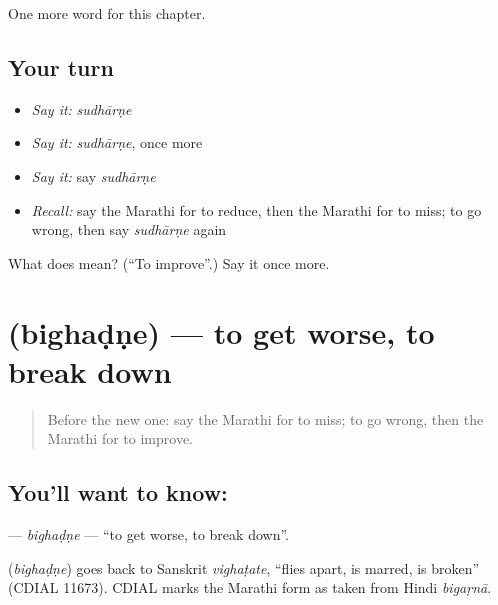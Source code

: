 \begin{grammarlens}[title={What you've built}]
One more word for this chapter.
\end{grammarlens}

\subsection*{Your turn}
\begin{itemize}
\raggedright
  \item \emph{Say it:} \emph{sudhārṇe}
  \item \emph{Say it:} \emph{sudhārṇe}, once more
  \item \emph{Say it:} say \emph{sudhārṇe}
  \item \emph{Recall:} say the Marathi for to reduce, then the Marathi for to miss; to go wrong, then say \emph{sudhārṇe} again
\end{itemize}

\begin{tcolorbox}[breakable,colback=teal!4,colframe=teal!35!black,title={Before you move on}]
What does  mean? (\textquotedblleft{}To improve\textquotedblright{}.) Say it once more.
\end{tcolorbox}
\section[\texorpdfstring{\mr{बिघडणे} (bighaḍṇe)}{बिघडणे (bighaḍṇe)}]{ (bighaḍṇe) — to get worse, to break down}

\label{lesson:MR-C165-bighadne}



\begin{quote}
Before the new one: say the Marathi for to miss; to go wrong, then the Marathi for to improve.
\end{quote}

\subsection*{You'll want to know: }
\textbf{} — \emph{bighaḍṇe} — \textquotedblleft{}to get worse, to break down\textquotedblright{}.

\begin{cousinweb}
\textbf{} (\emph{bighaḍṇe}) goes back to Sanskrit \emph{vighaṭate}, \textquotedblleft{}flies apart, is marred, is broken\textquotedblright{} (CDIAL 11673). CDIAL marks the Marathi form as taken from Hindi \emph{bigaṛnā}.
\end{cousinweb}

